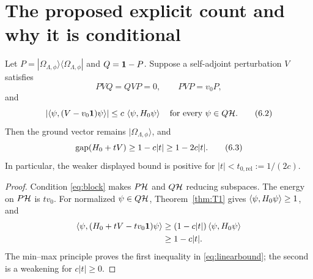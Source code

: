 \section{The proposed explicit count and why it is conditional}

\begin{proposition}
\label{prop:relative}
Let $P=|\Omega_{\Lambda,\phi}\rangle
\langle\Omega_{\Lambda,\phi}|$ and $Q=\mathbf 1-P$.  Suppose a self-adjoint
perturbation $V$ satisfies
\[
 PVQ=QVP=0,\qquad PVP=v_0P,
\tag{6.1}\label{eq:block}
\]
and
\[
 \left|
 \left\langle \psi,(V-v_0\mathbf 1)\psi\right\rangle
 \right|
 \leq c\,\left\langle \psi,H_0\psi\right\rangle
 \quad\text{for every }\psi\in Q\mathcal H.
\tag{6.2}\label{eq:formbound}
\]
Then the ground vector remains $|\Omega_{\Lambda,\phi}\rangle$, and
\[
 \operatorname{gap}(H_0+tV)\geq1-c|t|
 \geq1-2c|t|.
\tag{6.3}\label{eq:linearbound}
\]
In particular, the weaker displayed bound is positive for
$|t|<t_{0,\mathrm{rel}}:=1/(2c)$.
\end{proposition}

\begin{proof}
Condition \eqref{eq:block} makes $P\mathcal H$ and $Q\mathcal H$ reducing subspaces.
The energy on $P\mathcal H$ is $tv_0$.  For normalized $\psi\in Q\mathcal H$,
Theorem~\ref{thm:T1} gives
$\left\langle \psi,H_0\psi\right\rangle\geq1$, and
\[
\begin{aligned}
 \left\langle \psi,(H_0+tV-tv_0\mathbf 1)\psi\right\rangle
 &\geq
 (1-c|t|)\left\langle \psi,H_0\psi\right\rangle\\
 &\geq1-c|t|.
\end{aligned}
\]
The min--max principle proves the first inequality in
\eqref{eq:linearbound}; the second is a weakening for $c|t|\geq0$.
\end{proof}

